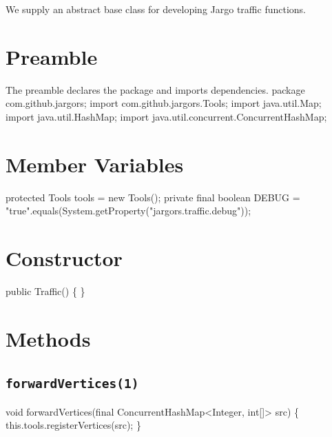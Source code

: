 We supply an abstract base class for developing Jargo traffic functions.

\section{Preamble}
The preamble declares the package and imports dependencies.
\nwenddocs{}\endmoddef{}
package com.github.jargors;
import com.github.jargors.Tools;
import java.util.Map;
import java.util.HashMap;
import java.util.concurrent.ConcurrentHashMap;
\nwendcode{}\nwdocspar

\section{Member Variables}
\nwenddocs{}\endmoddef{}
protected Tools tools = new Tools();
private final boolean DEBUG = "true".equals(System.getProperty("jargors.traffic.debug"));
\nwendcode{}\nwdocspar


\section{Constructor}
\nwenddocs{}\endmoddef{}
public Traffic() \{ \}
\nwendcode{}\nwdocspar

\section{Methods}

\subsection{\texttt{forwardVertices(1)}}
\nwenddocs{}\endmoddef{}
void forwardVertices(final ConcurrentHashMap<Integer, int[]> src) \{
  this.tools.registerVertices(src);
\}
\eatline
{}\nwendcode{}\nwdocspar
